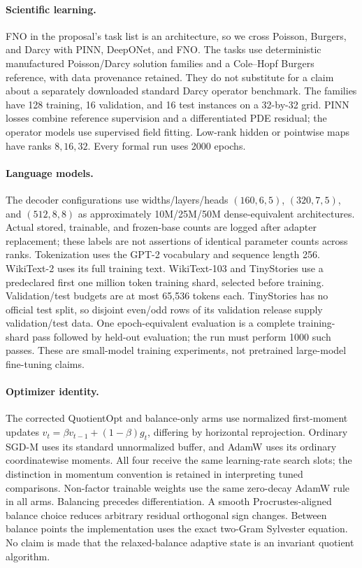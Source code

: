 \paragraph{Scientific learning.} FNO in the proposal's task list is an architecture, so we cross Poisson, Burgers, and Darcy with PINN, DeepONet, and FNO. The tasks use deterministic manufactured Poisson/Darcy solution families and a Cole--Hopf Burgers reference, with data provenance retained. They do not substitute for a claim about a separately downloaded standard Darcy operator benchmark. The families have 128 training, 16 validation, and 16 test instances on a 32-by-32 grid. PINN losses combine reference supervision and a differentiated PDE residual; the operator models use supervised field fitting. Low-rank hidden or pointwise maps have ranks $8,16,32$. Every formal run uses 2000 epochs.

\paragraph{Language models.} The decoder configurations use widths/layers/heads $(160,6,5)$, $(320,7,5)$, and $(512,8,8)$ as approximately 10M/25M/50M dense-equivalent architectures. Actual stored, trainable, and frozen-base counts are logged after adapter replacement; these labels are not assertions of identical parameter counts across ranks. Tokenization uses the GPT-2 vocabulary and sequence length 256. WikiText-2 uses its full training text. WikiText-103 and TinyStories use a predeclared first one million token training shard, selected before training. Validation/test budgets are at most 65,536 tokens each. TinyStories has no official test split, so disjoint even/odd rows of its validation release supply validation/test data. One epoch-equivalent evaluation is a complete training-shard pass followed by held-out evaluation; the run must perform 1000 such passes. These are small-model training experiments, not pretrained large-model fine-tuning claims.

\paragraph{Optimizer identity.} The corrected QuotientOpt and balance-only arms use normalized first-moment updates $v_t=\beta v_{t-1}+(1-\beta)g_t$, differing by horizontal reprojection. Ordinary SGD-M uses its standard unnormalized buffer, and AdamW uses its ordinary coordinatewise moments. All four receive the same learning-rate search slots; the distinction in momentum convention is retained in interpreting tuned comparisons. Non-factor trainable weights use the same zero-decay AdamW rule in all arms. Balancing precedes differentiation. A smooth Procrustes-aligned balance choice reduces arbitrary residual orthogonal sign changes. Between balance points the implementation uses the exact two-Gram Sylvester equation. No claim is made that the relaxed-balance adaptive state is an invariant quotient algorithm.

